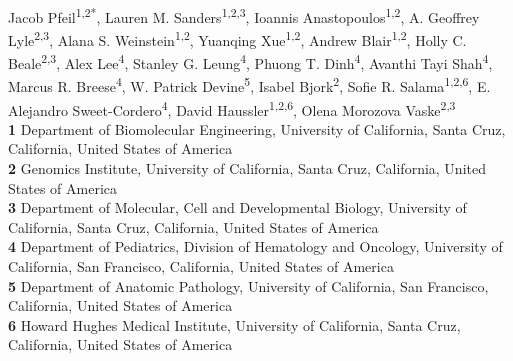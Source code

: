 \documentclass[10pt,letterpaper]{article}
\begin{document}
\vspace*{0.2in}

\begin{flushleft}
{\Large
\textbf{} %
}
\newline
\\
Jacob Pfeil\textsuperscript{1,2*},
Lauren M. Sanders\textsuperscript{1,2,3},
Ioannis Anastopoulos\textsuperscript{1,2},
A. Geoffrey Lyle\textsuperscript{2,3},
Alana S. Weinstein\textsuperscript{1,2},
Yuanqing Xue\textsuperscript{1,2},
Andrew Blair\textsuperscript{1,2},
Holly C. Beale\textsuperscript{2,3},
Alex Lee\textsuperscript{4},
Stanley G. Leung\textsuperscript{4},
Phuong T. Dinh\textsuperscript{4},
Avanthi Tayi Shah\textsuperscript{4},
Marcus R. Breese\textsuperscript{4},
W. Patrick Devine\textsuperscript{5},
Isabel Bjork\textsuperscript{2},
Sofie R. Salama\textsuperscript{1,2,6\ddag},
E. Alejandro Sweet-Cordero\textsuperscript{4\ddag},
David Haussler\textsuperscript{1,2,6\ddag},
Olena Morozova Vaske\textsuperscript{2,3\ddag}
\\
\bigskip
\textbf{1} Department of Biomolecular Engineering, University of California, Santa Cruz, California, United States of America
\\
\textbf{2} Genomics Institute, University of California, Santa Cruz, California, United States of America
\\
\textbf{3} Department of Molecular, Cell and Developmental Biology, University of California, Santa Cruz, California, United States of America
\\
\textbf{4} Department of Pediatrics, Division of Hematology and Oncology, University of California, San Francisco, California, United States of America
\\
\textbf{5} Department of Anatomic Pathology, University of California, San Francisco, California, United States of America
\\
\textbf{6} Howard Hughes Medical Institute, University of California, Santa Cruz, California, United States of America
\\
\bigskip


\end{flushleft}
\end{document}
